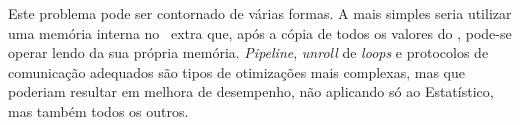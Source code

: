         Este problema pode ser contornado de várias formas.
        A mais simples seria utilizar uma memória interna no \hardware\ extra que, após a cópia de todos os valores do \buffer, pode-se operar lendo da sua própria memória.
        \textit{Pipeline}, \textit{unroll} de \textit{loops} e protocolos de comunicação adequados são tipos de otimizações mais complexas, mas que poderiam resultar em melhora de desempenho, não aplicando só ao Estatístico, mas também todos os outros.
        
        

